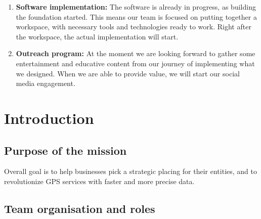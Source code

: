 \documentclass[11pt]{article}
\begin{document}
\begin{enumerate}
    \item\textbf{Software implementation:} {The software is already in progress, as building the foundation started. This means our team is focused on putting together a workspace, with necessary tools and technologies ready to work. Right after the workspace, the actual implementation will start.}
    \item\textbf{Outreach program:} {At the moment we are looking forward to gather some entertainment and educative content from our journey of implementing what we designed. When we are able to provide value, we will start our social media engagement.}
\end{enumerate}





\section{Introduction}

\subsection{Purpose of the mission}
\hspace{0.5cm} Overall goal is to help businesses pick a strategic placing for their entities, and to revolutionize GPS services with faster and more precise data. 

\subsection{Team organisation and roles}
\end{document}
